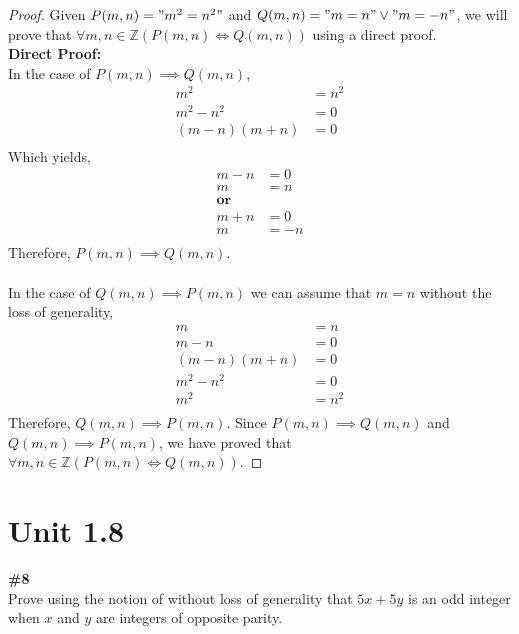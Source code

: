 \documentclass{article}
\newcommand{\unit}[1]{\section{Unit #1}}
\newcommand{\problem}[1]{\textbf{\##1}\\}
\newcommand{\Or}{\vee}
\newcommand{\AllIntegers}{\mathbb{Z}}
\begin{document}
\begin{proof}
    Given \(P(m,n) = "m^2 = n^2"\) and \(Q(m,n) = "m = n" \Or "m = -n"\), we will prove that \(\forall m,n \in \AllIntegers(P(m,n)\iff Q(m,n))\) using a direct proof.\\
    \textbf{Direct Proof:}\\
    In the case of \(P(m,n) \implies Q(m,n)\),\\
    \begin{align*}
        m^2 &= n^2\\
        m^2 - n^2 &= 0\\
        (m - n)(m + n) &= 0\\
    \end{align*}
    Which yields,
    \begin{align*}
        m - n &= 0\\
        m &= n\\
        \textbf{or}\\
        m + n &= 0\\
        m &= -n\\
    \end{align*}
    Therefore, \(P(m,n) \implies Q(m,n)\).\\\\
    In the case of \(Q(m,n) \implies P(m,n)\) we can assume that \(m = n\) without the loss of generality,\\
    \begin{align*}
        m &= n\\
        m - n &= 0\\
        (m - n)(m + n) &= 0\\
        m^2 - n^2 &= 0\\
        m^2 &= n^2\\
    \end{align*}
    Therefore, \(Q(m,n) \implies P(m,n)\).
    Since \(P(m,n) \implies Q(m,n)\) and \(Q(m,n) \implies P(m,n)\), we have proved that \(\forall m,n \in \AllIntegers(P(m,n)\iff Q(m,n))\).
\end{proof}

\pagebreak
\unit{1.8}
\problem{8}
Prove using the notion of without loss of generality that \(5x + 5y\) is an odd integer when \(x\) and \(y\) are integers of opposite parity.
\end{document}
